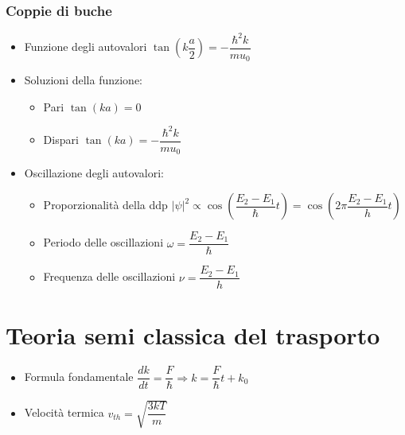 \documentclass[9pt]{extarticle}
\begin{document}
\subsubsection{Coppie di buche}
\begin{itemize}
  \item Funzione degli autovalori \( \tan\left( k \dfrac{a}{2} \right) = - \dfrac{\hbar ^2 k}{m u_0} \)
  \item Soluzioni della funzione:
        \begin{itemize}
          \item Pari \( \tan \left( ka \right) = 0 \)
          \item Dispari \( \tan \left( ka \right) = - \dfrac{\hbar ^ 2 k}{m u_0}  \)
        \end{itemize}
  \item Oscillazione degli autovalori:
        \begin{itemize}
          \item Proporzionalità della ddp \( \left| \psi \right| ^ 2 \propto \cos \left( \dfrac{E_2 - E_1}{\hbar} t \right) = \cos \left( 2 \pi \dfrac{E_2 - E_1}{h} t \right)  \)
          \item Periodo delle oscillazioni \( \omega = \dfrac{E_2 - E_1}{\hbar} \)
          \item Frequenza delle oscillazioni \( \nu = \dfrac{E_2 - E_1}{h} \)
        \end{itemize}
\end{itemize}

\newpage

\section{Teoria semi classica del trasporto}
\begin{itemize}
  \item Formula fondamentale \( \dfrac{dk}{dt} = \dfrac{F}{\hbar} \Rightarrow k = \dfrac{F}{\hbar} t + k_0 \)
  \item Velocità termica \( \displaystyle v_{th} = \sqrt{\dfrac{3 k T}{m}} \)
\end{itemize}
\end{document}
